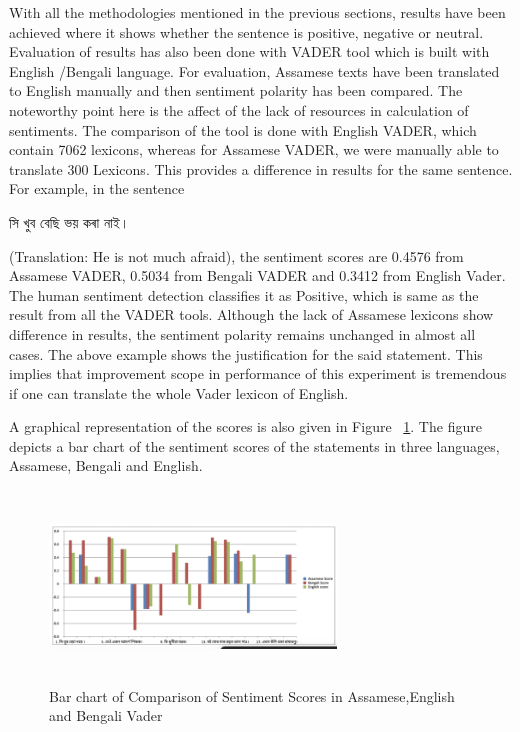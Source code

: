 \documentclass[conference]{IEEEtran}
\begin{document}
With all the methodologies mentioned in the previous sections, results have been achieved where it shows whether the sentence is positive, negative or neutral. Evaluation of results has also been done with VADER tool which is built with English /Bengali language. For evaluation, Assamese texts have been translated to English manually and then sentiment polarity has been compared. The noteworthy point here is the affect of the lack of resources in calculation of sentiments. The comparison of the tool is done with English VADER, which contain 7062 lexicons, whereas for Assamese VADER, we were manually able to translate 300 Lexicons. This provides a difference in results for the same sentence. For example, in the sentence \begin{bengali} সি খুব বেছি ভয় কৰা নাই।\end{bengali} (Translation:   He is not much afraid), the sentiment scores are 0.4576 from Assamese VADER, 0.5034 from Bengali VADER and 0.3412 from English Vader. The human sentiment detection classifies it as Positive, which is same as the result from all the VADER tools. Although the lack of Assamese lexicons show difference in results, the sentiment polarity remains unchanged in almost all cases. The above example shows the justification for the said statement. This implies that improvement scope in performance of this experiment is tremendous if one can translate the whole Vader lexicon of English.

A graphical representation of the scores is also given in Figure
~\ref{fig:bar1}. The figure depicts a bar chart of the sentiment scores of the statements in three languages, Assamese, Bengali and English.

\begin{figure}[htbp]
    \begin{center}
        \includegraphics[height=2in,width=3in]{bar1.png}
        \caption{Bar chart of Comparison of Sentiment Scores in Assamese,English and Bengali Vader}
        \label{fig:bar1}
    \end{center}
\end{figure}
\end{document}
